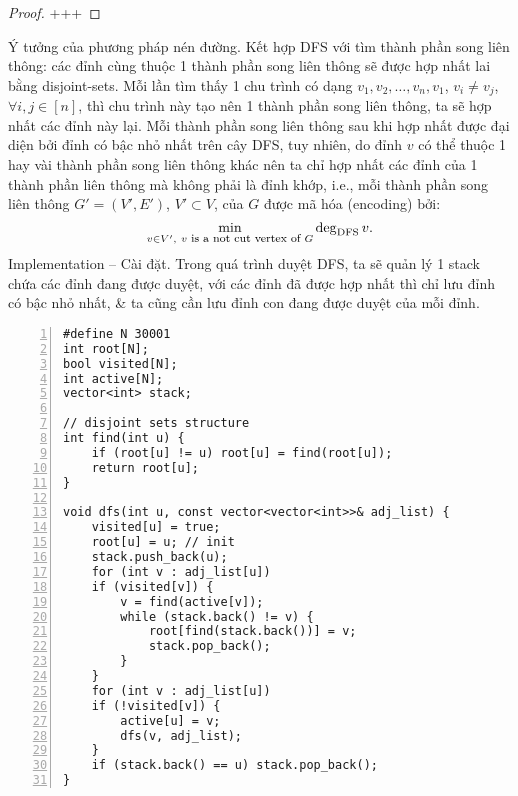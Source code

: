 \documentclass{article}
\begin{document}
\begin{proof}
    +++
\end{proof}
{\sf Ý tưởng của phương pháp nén đường.} Kết hợp DFS với tìm thành phần song liên thông: các đỉnh cùng thuộc 1 thành phần song liên thông sẽ được hợp nhất lai bằng disjoint-sets. Mỗi lần tìm thấy 1 chu trình có dạng $v_1,v_2,\ldots,v_n,v_1$, $v_i\ne v_j$, $\forall i,j\in[n]$, thì chu trình này tạo nên 1 thành phần song liên thông, ta sẽ hợp nhất các đỉnh này lại. Mỗi thành phần song liên thông sau khi hợp nhất được đại diện bởi đỉnh có bậc nhỏ nhất trên cây DFS, tuy nhiên, do đỉnh $v$ có thể thuộc 1 hay vài thành phần song liên thông khác nên ta chỉ hợp nhất các đỉnh của 1 thành phần liên thông mà không phải là đỉnh khớp, i.e., mỗi thành phần song liên thông $G' = (V',E')$, $V'\subset V$, của $G$ được mã hóa (encoding) bởi:
\begin{equation*}
    \min_{v\in V',\ v\mbox{\footnotesize\ is a not cut vertex of } G} \deg_{\rm DFS} v.
\end{equation*}
{\sf Implementation -- Cài đặt.} Trong quá trình duyệt DFS, ta sẽ quản lý 1 stack chứa các đỉnh đang được duyệt, với các đỉnh đã được hợp nhất thì chỉ lưu đỉnh có bậc nhỏ nhất, \& ta cũng cần lưu đỉnh con đang được duyệt của mỗi đỉnh.
\begin{Verbatim}[numbers=left,xleftmargin=5mm]
#define N 30001
int root[N];
bool visited[N];
int active[N];
vector<int> stack;

// disjoint sets structure
int find(int u) {
    if (root[u] != u) root[u] = find(root[u]);
    return root[u];
}

void dfs(int u, const vector<vector<int>>& adj_list) {
    visited[u] = true;
    root[u] = u; // init
    stack.push_back(u);
    for (int v : adj_list[u])
    if (visited[v]) {
        v = find(active[v]);
        while (stack.back() != v) {
            root[find(stack.back())] = v;
            stack.pop_back();
        }
    }
    for (int v : adj_list[u])
    if (!visited[v]) {
        active[u] = v;
        dfs(v, adj_list);
    }
    if (stack.back() == u) stack.pop_back();
}
\end{Verbatim}
\end{document}
